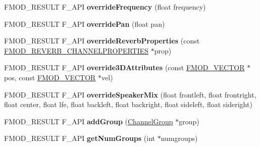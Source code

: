 \begin{DoxyCompactItemize}
\item 
F\+M\+O\+D\+\_\+\+R\+E\+S\+U\+LT F\+\_\+\+A\+PI {\bfseries override\+Frequency} (float frequency)\hypertarget{class_f_m_o_d_1_1_channel_group_ac15d292ec1377f365cc2e966a0778e0c}{}\label{class_f_m_o_d_1_1_channel_group_ac15d292ec1377f365cc2e966a0778e0c}

\item 
F\+M\+O\+D\+\_\+\+R\+E\+S\+U\+LT F\+\_\+\+A\+PI {\bfseries override\+Pan} (float pan)\hypertarget{class_f_m_o_d_1_1_channel_group_a5e1fae774340fed154eb6e72917f9c59}{}\label{class_f_m_o_d_1_1_channel_group_a5e1fae774340fed154eb6e72917f9c59}

\item 
F\+M\+O\+D\+\_\+\+R\+E\+S\+U\+LT F\+\_\+\+A\+PI {\bfseries override\+Reverb\+Properties} (const \hyperlink{struct_f_m_o_d___r_e_v_e_r_b___c_h_a_n_n_e_l_p_r_o_p_e_r_t_i_e_s}{F\+M\+O\+D\+\_\+\+R\+E\+V\+E\+R\+B\+\_\+\+C\+H\+A\+N\+N\+E\+L\+P\+R\+O\+P\+E\+R\+T\+I\+ES} $\ast$prop)\hypertarget{class_f_m_o_d_1_1_channel_group_a9d6ce9816c6c45180987a951125353fa}{}\label{class_f_m_o_d_1_1_channel_group_a9d6ce9816c6c45180987a951125353fa}

\item 
F\+M\+O\+D\+\_\+\+R\+E\+S\+U\+LT F\+\_\+\+A\+PI {\bfseries override3\+D\+Attributes} (const \hyperlink{struct_f_m_o_d___v_e_c_t_o_r}{F\+M\+O\+D\+\_\+\+V\+E\+C\+T\+OR} $\ast$pos, const \hyperlink{struct_f_m_o_d___v_e_c_t_o_r}{F\+M\+O\+D\+\_\+\+V\+E\+C\+T\+OR} $\ast$vel)\hypertarget{class_f_m_o_d_1_1_channel_group_aeabcc63a4a5668ed80a4e1bcafeaa159}{}\label{class_f_m_o_d_1_1_channel_group_aeabcc63a4a5668ed80a4e1bcafeaa159}

\item 
F\+M\+O\+D\+\_\+\+R\+E\+S\+U\+LT F\+\_\+\+A\+PI {\bfseries override\+Speaker\+Mix} (float frontleft, float frontright, float center, float lfe, float backleft, float backright, float sideleft, float sideright)\hypertarget{class_f_m_o_d_1_1_channel_group_a69b1616ac61b95721dc0e0e1542a499d}{}\label{class_f_m_o_d_1_1_channel_group_a69b1616ac61b95721dc0e0e1542a499d}

\item 
F\+M\+O\+D\+\_\+\+R\+E\+S\+U\+LT F\+\_\+\+A\+PI {\bfseries add\+Group} (\hyperlink{class_f_m_o_d_1_1_channel_group}{Channel\+Group} $\ast$group)\hypertarget{class_f_m_o_d_1_1_channel_group_acd57c9678884e01c71836520b5335516}{}\label{class_f_m_o_d_1_1_channel_group_acd57c9678884e01c71836520b5335516}

\item 
F\+M\+O\+D\+\_\+\+R\+E\+S\+U\+LT F\+\_\+\+A\+PI {\bfseries get\+Num\+Groups} (int $\ast$numgroups)\hypertarget{class_f_m_o_d_1_1_channel_group_afa0b87ae5828685c64c1aa921872fd58}{}\label{class_f_m_o_d_1_1_channel_group_afa0b87ae5828685c64c1aa921872fd58}


\end{DoxyCompactItemize}
